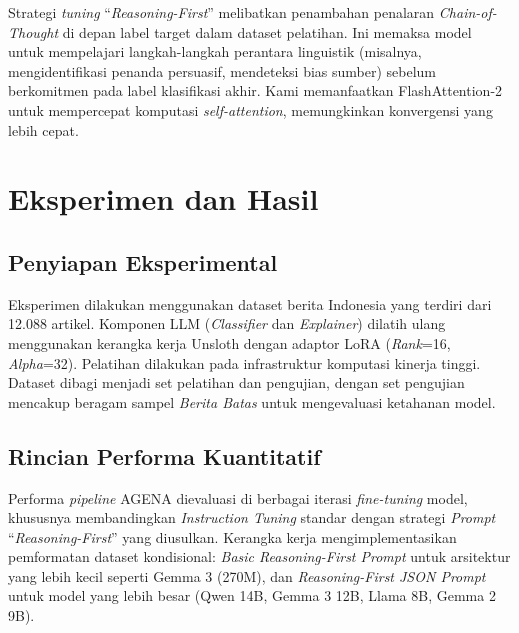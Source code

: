 \documentclass{ieeeaccess}
\begin{document}
Strategi \textit{tuning} ``\textit{Reasoning-First}'' melibatkan penambahan penalaran \textit{Chain-of-Thought} di depan label target dalam dataset pelatihan. Ini memaksa model untuk mempelajari langkah-langkah perantara linguistik (misalnya, mengidentifikasi penanda persuasif, mendeteksi bias sumber) sebelum berkomitmen pada label klasifikasi akhir. Kami memanfaatkan FlashAttention-2 untuk mempercepat komputasi \textit{self-attention}, memungkinkan konvergensi yang lebih cepat.

\section{Eksperimen dan Hasil}
\label{sec:experiments}
\subsection{Penyiapan Eksperimental}
Eksperimen dilakukan menggunakan dataset berita Indonesia yang terdiri dari 12.088 artikel. Komponen LLM (\textit{Classifier} dan \textit{Explainer}) dilatih ulang menggunakan kerangka kerja Unsloth dengan adaptor LoRA (\textit{Rank}=16, \textit{Alpha}=32). Pelatihan dilakukan pada infrastruktur komputasi kinerja tinggi. Dataset dibagi menjadi set pelatihan dan pengujian, dengan set pengujian mencakup beragam sampel \textit{Berita Batas} untuk mengevaluasi ketahanan model.

\subsection{Rincian Performa Kuantitatif}
Performa \textit{pipeline} AGENA dievaluasi di berbagai iterasi \textit{fine-tuning} model, khususnya membandingkan \textit{Instruction Tuning} standar dengan strategi \textit{Prompt} ``\textit{Reasoning-First}'' yang diusulkan. Kerangka kerja mengimplementasikan pemformatan dataset kondisional: \textit{Basic Reasoning-First Prompt} untuk arsitektur yang lebih kecil seperti Gemma 3 (270M), dan \textit{Reasoning-First JSON Prompt} untuk model yang lebih besar (Qwen 14B, Gemma 3 12B, Llama 8B, Gemma 2 9B).
\end{document}
